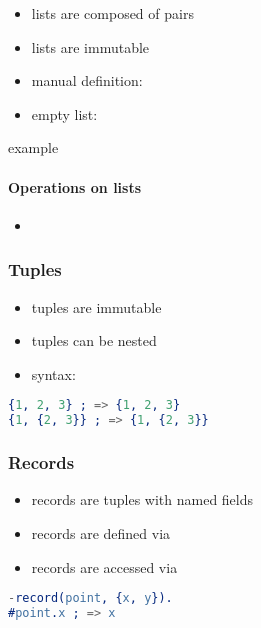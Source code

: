 \documentclass[a4paper,landscape,10pt]{article}
\begin{document}
\begin{multicols*}{2}
  \begin{itemize}
    \item lists are composed of pairs
    \item lists are immutable
    \item manual definition: \ierlang{[1, 2, 3]}
    \item empty list: \ierlang{[]}
  \end{itemize}

  \missing example

  \paragraph{Operations on lists}

  \begin{itemize}
    \item \missing
  \end{itemize}

  \subsubsection{Tuples}

  \begin{itemize}
    \item tuples are immutable
    \item tuples can be nested
    \item syntax: 
  \end{itemize}

  \begin{lstlisting}[language=Erlang]
{1, 2, 3} ; => {1, 2, 3}
{1, {2, 3}} ; => {1, {2, 3}}
\end{lstlisting}

  \subsubsection{Records}

  \begin{itemize}
    \item records are tuples with named fields
    \item records are defined via 
    \item records are accessed via 
  \end{itemize}

  \begin{lstlisting}[language=Erlang]
-record(point, {x, y}).
#point.x ; => x
\end{lstlisting}


\end{multicols*}
\end{document}
